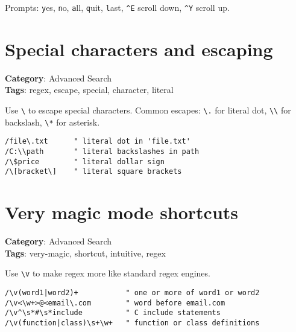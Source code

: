 Prompts: {\footnotesize \Verb§y§}es, {\footnotesize \Verb§n§}o, {\footnotesize \Verb§a§}ll, {\footnotesize \Verb§q§}uit, {\footnotesize \Verb§l§}ast, {\footnotesize \Verb§^E§} scroll down, {\footnotesize \Verb§^Y§} scroll up.

\section{Special characters and escaping}

\textbf{Category}: Advanced Search\\ \textbf{Tags}: regex, escape, special, character, literal
\vspace{0.5cm}

Use {\footnotesize \Verb§\§} to escape special characters. Common escapes: {\footnotesize \Verb§\.§} for literal dot, {\footnotesize \Verb§\\§} for backslash, {\footnotesize \Verb§\*§} for asterisk.

\begin{Exa*}{}
\begin{Verbatim}[fontsize=\footnotesize, breaklines, breakanywhere]
/file\.txt      " literal dot in 'file.txt'
/C:\\path       " literal backslashes in path
/\$price        " literal dollar sign
/\[bracket\]    " literal square brackets
\end{Verbatim}
\end{Exa*}

\section{Very magic mode shortcuts}

\textbf{Category}: Advanced Search\\ \textbf{Tags}: very-magic, shortcut, intuitive, regex
\vspace{0.5cm}

Use {\footnotesize \Verb§\v§} to make regex more like standard regex engines.

\begin{Exa*}{}
\begin{Verbatim}[fontsize=\footnotesize, breaklines, breakanywhere]
/\v(word1|word2)+           " one or more of word1 or word2
/\v<\w+>@<email\.com        " word before email.com
/\v^\s*#\s*include          " C include statements
/\v(function|class)\s+\w+   " function or class definitions
\end{Verbatim}
\end{Exa*}

